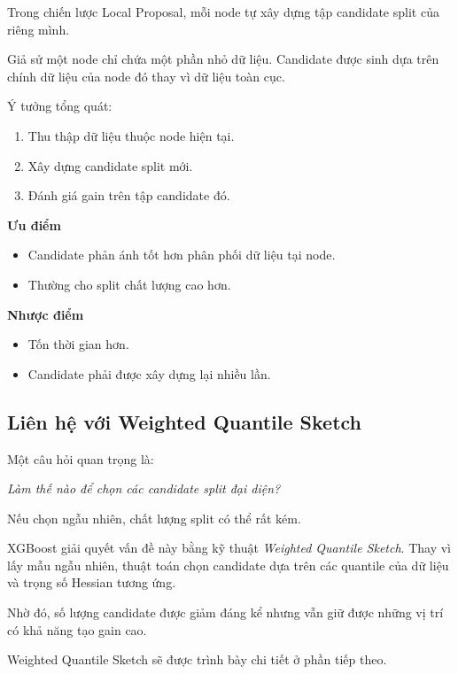 Trong chiến lược Local Proposal, mỗi node tự xây dựng tập candidate split của riêng mình.

Giả sử một node chỉ chứa một phần nhỏ dữ liệu. Candidate được sinh dựa trên chính dữ liệu của node đó thay vì dữ liệu toàn cục.

Ý tưởng tổng quát:

\begin{enumerate}
    \item Thu thập dữ liệu thuộc node hiện tại.
    \item Xây dựng candidate split mới.
    \item Đánh giá gain trên tập candidate đó.
\end{enumerate}

\textbf{Ưu điểm}

\begin{itemize}
    \item Candidate phản ánh tốt hơn phân phối dữ liệu tại node.
    \item Thường cho split chất lượng cao hơn.
\end{itemize}

\textbf{Nhược điểm}

\begin{itemize}
    \item Tốn thời gian hơn.
    \item Candidate phải được xây dựng lại nhiều lần.
\end{itemize}

\subsection{Liên hệ với Weighted Quantile Sketch}

Một câu hỏi quan trọng là:

\begin{center}
\textit{Làm thế nào để chọn các candidate split đại diện?}
\end{center}

Nếu chọn ngẫu nhiên, chất lượng split có thể rất kém.

XGBoost giải quyết vấn đề này bằng kỹ thuật \textit{Weighted Quantile Sketch}. Thay vì lấy mẫu ngẫu nhiên, thuật toán chọn candidate dựa trên các quantile của dữ liệu và trọng số Hessian tương ứng.

Nhờ đó, số lượng candidate được giảm đáng kể nhưng vẫn giữ được những vị trí có khả năng tạo gain cao.

Weighted Quantile Sketch sẽ được trình bày chi tiết ở phần tiếp theo.

